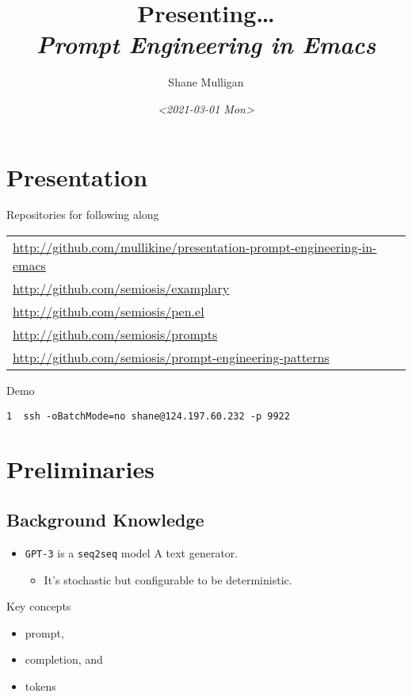 \documentclass[presentation]{beamer}
\author{Shane Mulligan \\  }
\date{\textit{<2021-03-01 Mon>}}
\title{Presenting\ldots{} \\   \emph{\alert{Prompt Engineering in Emacs}} \\  }
\begin{document}
\maketitle

\section{Presentation}
\label{sec:org45f7082}
\begin{frame}[label={sec:org7d38c6e}]{Repositories for following along}
{\footnotesize
\begin{center}
\begin{tabular}{l}
\url{http://github.com/mullikine/presentation-prompt-engineering-in-emacs}\\
\url{http://github.com/semiosis/examplary}\\
\url{http://github.com/semiosis/pen.el}\\
\url{http://github.com/semiosis/prompts}\\
\url{http://github.com/semiosis/prompt-engineering-patterns}\\
\end{tabular}
\end{center}
}
\end{frame}

\begin{frame}[label={sec:org9e5beb3},fragile]{Demo}
 \begin{verbatim}
1  ssh -oBatchMode=no shane@124.197.60.232 -p 9922
\end{verbatim}
\end{frame}

\section{Preliminaries}
\label{sec:org84afd27}
\subsection{Background Knowledge}
\label{sec:orgd29b3a7}
\begin{itemize}
\item \texttt{GPT-3} is a \texttt{seq2seq} model
A text generator.
\begin{itemize}
\item It's stochastic
but configurable to be deterministic.
\end{itemize}
\end{itemize}

\begin{frame}[label={sec:orgfaf1f8c}]{Key concepts}
\begin{itemize}
\item prompt,
\item completion, and
\item tokens
\end{itemize}
\end{frame}
\end{document}
